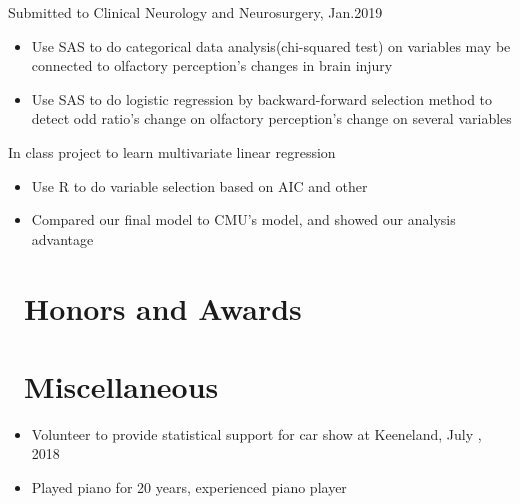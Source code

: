 \documentclass{resume}
\begin{document}
Submitted to Clinical Neurology and Neurosurgery, Jan.2019
\begin{itemize}
  \item Use SAS to do categorical data analysis(chi-squared test) on variables may be connected to olfactory perception's changes in brain injury 
  \item Use SAS to do logistic regression by backward-forward selection method to detect odd ratio's change on olfactory perception's change on several variables 
\end{itemize}

In class project to learn multivariate linear regression
\begin{itemize}
  \item Use R to do variable selection based on AIC and other  
  \item Compared our final model to CMU's model, and showed our analysis advantage
\end{itemize}


\section{\faHeartO\ Honors and Awards}

\section{\faInfo\ Miscellaneous}
\begin{itemize}[parsep=0.5ex]
  \item Volunteer to provide statistical support for car show at Keeneland, July \textit{}, 2018
  \item Played piano for 20 years, experienced piano player
\end{itemize}

%
%
\end{document}
